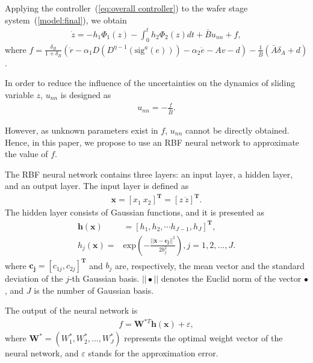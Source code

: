 \documentclass{ifacconf}
\newcommand{\LS}[1]{\textcolor{blue}{\textbf{#1}}}
\begin{document}
Applying the controller~(\ref{eq:overall controller}) to the wafer stage system~(\ref{model:final}), we obtain
\begin{align}
    \dot{z}= -h_1\Phi_1(z)-\int_0^t h_2 \Phi_2(z) dt+\bar{B}u_{nn}+f,
\end{align}
where $f=\frac{\delta_B}{1+\delta_B}(\ddot{r}-\alpha_1D(D^{\eta-1}(\textrm{sig}^a(e)))-\alpha_2\dot{e}-Av-d)-\frac{1}{\bar{B}}(\bar{A}\delta_A+d)$.

In order to reduce the influence of the uncertainties on the dynamics of sliding variable $z$, $u_{nn}$ is designed as 
\begin{align} \label{eq: initial nn controller}
    u_{nn}=-\frac{f}{\bar{B}}.
\end{align}

However, as unknown parameters exist in $f$, $u_{nn}$ cannot be directly obtained. Hence, in this paper, we propose to use an RBF neural network to approximate the value of $f$.

The RBF neural network contains three layers: an input layer, a hidden layer, and an output layer. The input layer is defined as 
\begin{align}
    \bm{x}=[x_1~x_2]^{\bm{T}}=[z~\dot{z}]^{\bm{T}}.
\end{align}
The hidden layer consists of Gaussian functions, and it is presented as
\begin{align}
\bm{h}(\bm{x})&=[h_1, h_2, \cdots h_{J-1}, h_{J}]^{\bm{T}}, \\
    h_j(\bm{x})=&\textrm{exp} \left(-{\frac{||\bm{x}-\bm{c_j}||^2}{2b_j^2}}\right),j=1,2,...,J.
\end{align}
where $\bm{c_j}=[c_{1j}, c_{2j}]^{\bm{T}}$ and $b_j$ are, respectively, the mean vector and the standard deviation of the $j$-th Gaussian basis. $||\bullet||$ denotes the Euclid norm of the vector $\bullet$, and $J$ is the number of Gaussian basis.


The output of the neural network is 
\begin{align}
    f=\bm{W}^{*T}\bm{h}(\bm{x})+{\varepsilon},
\end{align}
where $\bm{W}^{*}=(W_1^*,W_2^*,...,W_J^*)$ represents the optimal weight vector of the neural network, and $\varepsilon$ stands for the approximation error.
\end{document}
